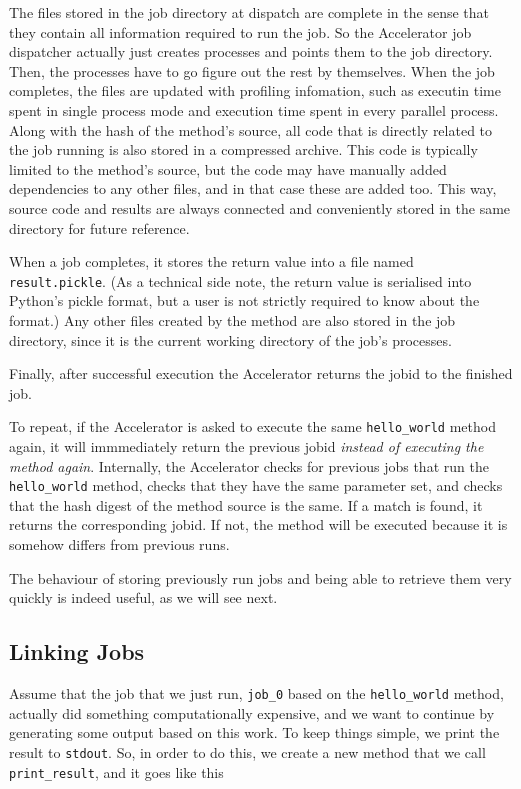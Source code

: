 \documentclass[a4paper]{article}
\begin{document}
The files stored in the job directory at dispatch are complete in the
sense that they contain all information required to run the job.  So
the Accelerator job dispatcher actually just creates processes and
points them to the job directory.  Then, the processes have to go
figure out the rest by themselves.  When the job completes, the files
are updated with profiling infomation, such as executin time spent in
single process mode and execution time spent in every parallel
process.  Along with the hash of the method's source, all code that is
directly related to the job running is also stored in a compressed
archive.  This code is typically limited to the method's source, but
the code may have manually added dependencies to any other files, and
in that case these are added too.  This way, source code and results
are always connected and conveniently stored in the same directory for
future reference.

When a job completes, it stores the return value into a file named
\texttt{result.pickle}.  (As a technical side note, the return value
is serialised into Python's pickle format, but a user is not strictly
required to know about the format.)  Any other files created by the
method are also stored in the job directory, since it is the current
working directory of the job's processes.

Finally, after successful execution the Accelerator returns the jobid
to the finished job.

To repeat, if the Accelerator is asked to execute the same
\texttt{hello\_world} method again, it will immmediately return the
previous jobid \textsl{instead of executing the method again}.
Internally, the Accelerator checks for previous jobs that run the
\texttt{hello\_world} method, checks that they have the same parameter
set, and checks that the hash digest of the method source is the same.
If a match is found, it returns the corresponding jobid.  If not, the
method will be executed because it is somehow differs from previous
runs.

The behaviour of storing previously run jobs and being able to
retrieve them very quickly is indeed useful, as we will see next.



\subsection{Linking Jobs}
Assume that the job that we just run, \texttt{job\_0} based on the
\texttt{hello\_world} method, actually did something computationally
expensive, and we want to continue by generating some output based on
this work.  To keep things simple, we print the result to
\texttt{stdout}.  So, in order to do this, we create a new method that
we call \texttt{print\_result}, and it goes like this
\end{document}
